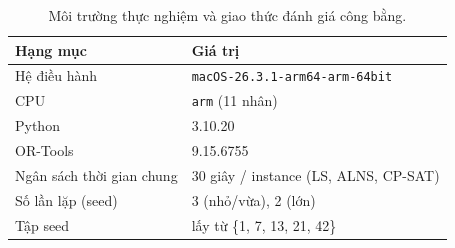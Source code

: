 \begin{table}[H]
\centering\small
\caption{Môi trường thực nghiệm và giao thức đánh giá công bằng.}
\label{tab:bench-env}
\begin{tabular}{ll}
\toprule
Hạng mục & Giá trị \\
\midrule
Hệ điều hành & \texttt{macOS-26.3.1-arm64-arm-64bit} \\
CPU & \texttt{arm} (11 nhân) \\
Python & 3.10.20 \\
OR-Tools & 9.15.6755 \\
Ngân sách thời gian chung & 30 giây / instance (LS, ALNS, CP-SAT) \\
Số lần lặp (seed) & 3 (nhỏ/vừa), 2 (lớn) \\
Tập seed & lấy từ \{1, 7, 13, 21, 42\} \\
\bottomrule
\end{tabular}
\end{table}
